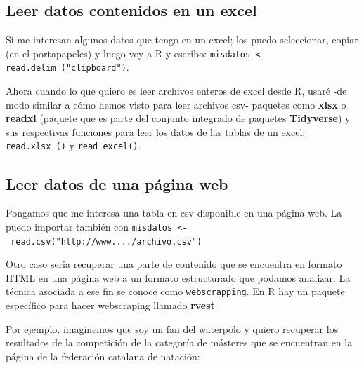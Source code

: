 \documentclass[]{book}
\newenvironment{Shaded}{\begin{snugshade}}{\end{snugshade}}
\newcommand{\KeywordTok}[1]{\textcolor[rgb]{0.13,0.29,0.53}{\textbf{{#1}}}}
\newcommand{\DecValTok}[1]{\textcolor[rgb]{0.00,0.00,0.81}{{#1}}}
\newcommand{\StringTok}[1]{\textcolor[rgb]{0.31,0.60,0.02}{{#1}}}
\newcommand{\CommentTok}[1]{\textcolor[rgb]{0.56,0.35,0.01}{\textit{{#1}}}}
\newcommand{\NormalTok}[1]{{#1}}
\theoremstyle{definition}
\theoremstyle{definition}
\theoremstyle{remark}
\begin{document}
\subsection{Leer datos contenidos en un
excel}\label{leer-datos-contenidos-en-un-excel}

Si me interesan algunos datos que tengo en un excel; los puedo
seleccionar, copiar (en el portapapeles) y luego voy a R y escribo:
\texttt{misdatos\ \textless{}-read.delim\ ("clipboard")}.

Ahora cuando lo que quiero es leer archivos enteros de excel desde R,
usaré -de modo similar a cómo hemos visto para leer archivos csv-
paquetes como \textbf{xlsx} \citep{R-xlsx} o \textbf{readxl}
\citep{R-readxl} (paquete que es parte del conjunto integrado de
paquetes \textbf{Tidyverse}) y sus respectivas funciones para leer los
datos de las tablas de un excel: \texttt{read.xlsx\ ()} y
\texttt{read\_excel()}.

\subsection{Leer datos de una página
web}\label{leer-datos-de-una-pagina-web}

Pongamos que me interesa una tabla en csv disponible en una página web.
La puedo importar también con
\texttt{misdatos\ \textless{}-\ read.csv("http://www..../archivo.csv")}

Otro caso seria recuperar una parte de contenido que se encuentra en
formato HTML en una página web a un formato estructurado que podamos
analizar. La técnica asociada a ese fin se conoce como
\texttt{webscrapping}. En R hay un paquete específico para hacer
webscraping llamado \textbf{rvest} \citep{R-rvest}

Por ejemplo, imaginemos que soy un fan del waterpolo y quiero recuperar
los resultados de la competición de la categoría de másteres que se
encuentran en la página de la federación catalana de natación:

\begin{Shaded}
\end{Shaded}
\end{document}
